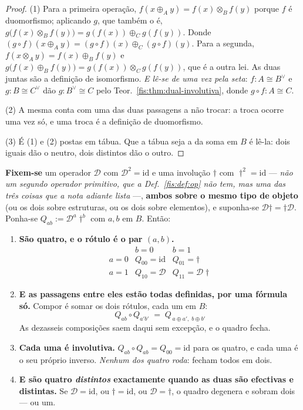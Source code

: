 \documentclass[livro.tex]{subfiles}
\begin{document}
\begin{proof}
(1) Para a primeira operação, $f(x\oplus_A y)=f(x)\otimes_B f(y)$ porque $f$ é
duomorfismo; aplicando $g$, que também o é,
$g\bigl(f(x)\otimes_B f(y)\bigr)=g(f(x))\oplus_C g(f(y))$. Donde
$(g\circ f)(x\oplus_A y)=(g\circ f)(x)\oplus_C(g\circ f)(y)$. Para a segunda,
$f(x\otimes_A y)=f(x)\oplus_B f(y)$ e
$g\bigl(f(x)\oplus_B f(y)\bigr)=g(f(x))\otimes_C g(f(y))$, que é a outra lei.
As duas juntas são a definição de isomorfismo. \emph{E lê-se de uma vez pela
seta}: $f\colon A\cong B^{\vee}$ e $g\colon B\cong C^{\vee}$ dão
$g\colon B^{\vee}\cong C$ pelo Teor.~\ref{fis:thm:dual-involutiva}, donde
$g\circ f\colon A\cong C$.

(2) A mesma conta com uma das duas passagens a não trocar: a troca ocorre uma vez
só, e uma troca é a definição de duomorfismo.

(3) É (1) e (2) postas em tábua. Que a tábua seja a da soma em $B$ é lê-la: dois
iguais dão o neutro, dois distintos dão o outro.
\end{proof}

\begin{teorema}\label{fis:thm:quarteto}
\textbf{Fixem-se} um operador $\mathcal{D}$ com $\mathcal{D}^{2}=\mathrm{id}$ e
uma involução $\dagger$ com $\dagger^{2}=\mathrm{id}$ --- \emph{não um segundo
operador primitivo, que a Def.~\ref{fis:def:op} não tem, mas uma das três coisas
que a nota adiante lista} ---, \textbf{ambos sobre o mesmo tipo de objeto} (ou os
dois sobre estruturas, ou os dois sobre elementos), e suponha-se
$\mathcal{D}\dagger=\dagger\mathcal{D}$. Ponha-se
$Q_{ab}:=\mathcal{D}^{a}\dagger^{b}$ com $a,b$ em $B$. Então:
\begin{enumerate}\itemsep3pt
\item[(1)] \textbf{São quatro, e o rótulo é o par $(a,b)$.}
\[
\boxed{
\begin{array}{c|cc}
 & b=0 & b=1\\\hline
a=0 & Q_{00}=\mathrm{id} & Q_{01}=\dagger\\[2pt]
a=1 & Q_{10}=\mathcal{D} & Q_{11}=\mathcal{D}\dagger
\end{array}}
\]
\item[(2)] \textbf{E as passagens entre eles estão todas definidas, por uma
fórmula só.} Compor é somar os dois rótulos, cada um em $B$:
\[
\boxed{\;Q_{ab}\circ Q_{a'b'}\;=\;Q_{\,a\oplus a',\;b\oplus b'}\;}
\]
As dezasseis composições saem daqui sem excepção, e o quadro fecha.
\item[(3)] \textbf{Cada uma é involutiva.} $Q_{ab}\circ Q_{ab}=Q_{00}=\mathrm{id}$
para os quatro, e cada uma é o seu próprio inverso. \emph{Nenhum dos quatro
roda}: fecham todos em dois.
\item[(4)] \textbf{E são quatro \emph{distintos} exactamente quando as duas são
efectivas e distintas.} Se $\mathcal{D}=\mathrm{id}$, ou $\dagger=\mathrm{id}$,
ou $\mathcal{D}=\dagger$, o quadro degenera e sobram dois --- ou um.
\end{enumerate}
\end{teorema}
\end{document}
